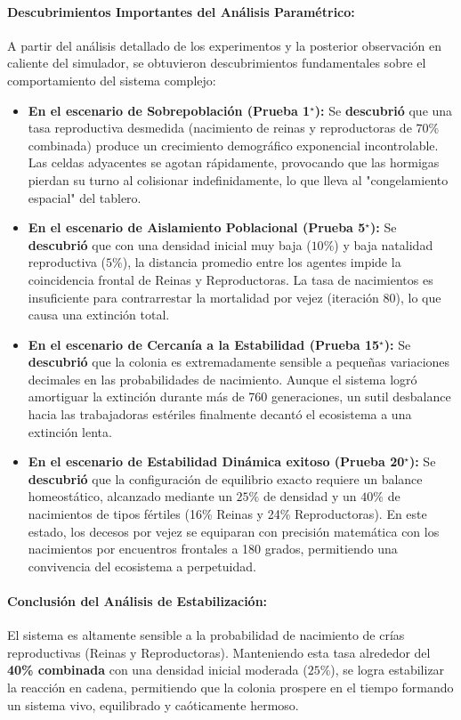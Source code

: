 \documentclass[12pt,a4paper]{article}
\begin{document}
\paragraph{Descubrimientos Importantes del Análisis Paramétrico:}
A partir del análisis detallado de los experimentos y la posterior observación en caliente del simulador, se obtuvieron descubrimientos fundamentales sobre el comportamiento del sistema complejo:
\begin{itemize}
    \item \textbf{En el escenario de Sobrepoblación (Prueba 1$^\star$):} Se \textbf{descubrió} que una tasa reproductiva desmedida (nacimiento de reinas y reproductoras de $70\%$ combinada) produce un crecimiento demográfico exponencial incontrolable. Las celdas adyacentes se agotan rápidamente, provocando que las hormigas pierdan su turno al colisionar indefinidamente, lo que lleva al "congelamiento espacial" del tablero.
    \item \textbf{En el escenario de Aislamiento Poblacional (Prueba 5$^\star$):} Se \textbf{descubrió} que con una densidad inicial muy baja ($10\%$) y baja natalidad reproductiva ($5\%$), la distancia promedio entre los agentes impide la coincidencia frontal de Reinas y Reproductoras. La tasa de nacimientos es insuficiente para contrarrestar la mortalidad por vejez (iteración 80), lo que causa una extinción total.
    \item \textbf{En el escenario de Cercanía a la Estabilidad (Prueba 15$^\star$):} Se \textbf{descubrió} que la colonia es extremadamente sensible a pequeñas variaciones decimales en las probabilidades de nacimiento. Aunque el sistema logró amortiguar la extinción durante más de 760 generaciones, un sutil desbalance hacia las trabajadoras estériles finalmente decantó el ecosistema a una extinción lenta.
    \item \textbf{En el escenario de Estabilidad Dinámica exitoso (Prueba 20$^\star$):} Se \textbf{descubrió} que la configuración de equilibrio exacto requiere un balance homeostático, alcanzado mediante un $25\%$ de densidad y un $40\%$ de nacimientos de tipos fértiles (16\% Reinas y 24\% Reproductoras). En este estado, los decesos por vejez se equiparan con precisión matemática con los nacimientos por encuentros frontales a 180 grados, permitiendo una convivencia del ecosistema a perpetuidad.
\end{itemize}

\paragraph{Conclusión del Análisis de Estabilización:}
El sistema es altamente sensible a la probabilidad de nacimiento de crías reproductivas (Reinas y Reproductoras). Manteniendo esta tasa alrededor del \textbf{40\% combinada} con una densidad inicial moderada ($25\%$), se logra estabilizar la reacción en cadena, permitiendo que la colonia prospere en el tiempo formando un sistema vivo, equilibrado y caóticamente hermoso.
\end{document}
